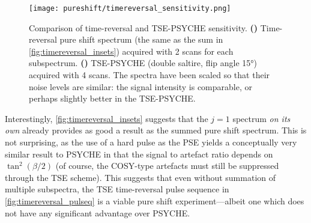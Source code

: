 \begin{figure}[htb]
    \centering
    \texttt{[image: pureshift/timereversal\_sensitivity.png]}%
    {\label{fig:timereversal_sensitivity_tr}}%
    {\label{fig:timereversal_sensitivity_tsepsyche}}%
    \caption[Comparison of time-reversal and TSE-PSYCHE sensitivity]{
        Comparison of time-reversal and TSE-PSYCHE sensitivity.
        \textbf{()} Time-reversal pure shift spectrum (the same as the sum in \cref{fig:timereversal_insets}) acquired with 2 scans for each subspectrum.
        \textbf{()} TSE-PSYCHE (double saltire, flip angle \ang{15}) acquired with 4 scans.
        The spectra have been scaled so that their noise levels are similar: the signal intensity is comparable, or perhaps slightly better in the TSE-PSYCHE.
    }
    \label{fig:timereversal_sensitivity}
\end{figure}

Interestingly, \cref{fig:timereversal_insets} suggests that the $j = 1$ spectrum \textit{on its own} already provides as good a result as the summed pure shift spectrum.
This is not surprising, as the use of a hard pulse as the PSE yields a conceptually very similar result to PSYCHE in that the signal to artefact ratio depends on $\tan^2(\beta/2)$ (of course, the COSY-type artefacts must still be suppressed through the TSE scheme).
This suggests that even without summation of multiple subspectra, the TSE time-reversal pulse sequence in \cref{fig:timereversal_pulseq} is a viable pure shift experiment---albeit one which does not have any significant advantage over PSYCHE.
